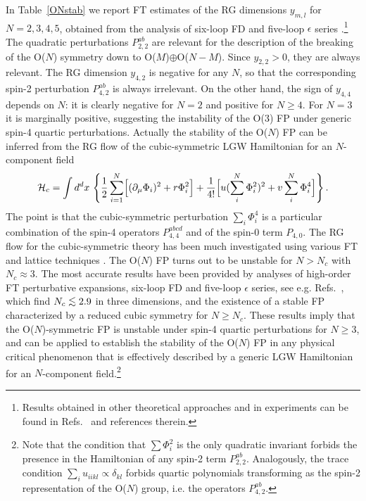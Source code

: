 \documentclass[a4paper,12pt]{article}
\def\spose#1{\hbox to 0pt{#1\hss}}
\def\ltapprox{\mathrel{\spose{\lower 3pt\hbox{$\mathchar"218$}}
 \raise 2.0pt\hbox{$\mathchar"13C$}}}
\begin{document}
In Table~\ref{ONstab} we report FT estimates of 
the RG dimensions $y_{m,l}$
for $N=2,3,4,5$, obtained from the analysis of six-loop FD
and five-loop $\epsilon$ series 
\cite{CPV-02,CPV-02-mc,GZ-98}.\footnote{Results obtained in 
other theoretical approaches and in experiments  
can be found in Refs.~\cite{CPV-02-mc,review} and references therein.}
The quadratic perturbations $P_{2,2}^{ab}$ are relevant for the description of 
the breaking of the O($N$) symmetry down to O($M$)$\oplus$O($N-M$).
Since $y_{2,2}>0$, they are always relevant.
The RG dimension $y_{4,2}$ is negative for any $N$, so that the corresponding
spin-2 perturbation $P_{4,2}^{ab}$ is always irrelevant.
On the other hand, the sign of $y_{4,4}$ depends on $N$:
it is clearly negative for $N=2$ and positive for $N\ge 4$.
For $N=3$ it is marginally positive, suggesting the instability
of the O(3) FP under generic spin-4 quartic perturbations.
Actually the stability of the O($N$) FP 
can be inferred from the RG flow of the cubic-symmetric LGW Hamiltonian
for an $N$-component field
\begin{equation}
{\cal H}_{c} =  \int d^d x\, \left\{ {1\over 2} \sum_{i=1}^{N}
      \Bigl[ (\partial_\mu \Phi_i)^2 +  r \Phi_i^2 \Bigr]  
+{1\over 4!} \Bigl[ u (\sum_i^N \Phi_i^2)^2 + v \sum_i^N \Phi_i^4 \Bigr]
\right \} .
\label{Hphi4cubic}
\end{equation}
The point is that the cubic-symmetric 
perturbation $\sum_i \Phi_i^4$
is a particular combination of the spin-4 operators $P_{4,4}^{abcd}$ and 
of the spin-0 term $P_{4,0}$.  
The RG flow for the cubic-symmetric theory has been much investigated
using various FT and lattice techniques \cite{review}. 
The O($N$) FP turns out to be unstable for $N>N_c$ with $N_c\approx 3$.
The most accurate results have been provided by analyses of 
high-order FT perturbative expansions, six-loop FD 
and five-loop $\epsilon$ series, see e.g. Refs.~\cite{CPV-00,FHY-00},
which find $N_c\ltapprox 2.9$ in three dimensions, and the existence of 
a stable FP characterized by a reduced cubic symmetry for $N\geq N_c$.
These results imply that
the O($N$)-symmetric FP is unstable under spin-4 quartic perturbations 
for $N\ge 3$,
and can be applied to establish the stability of the O($N$) FP
in any physical critical phenomenon that is effectively described
by a generic LGW Hamiltonian for an $N$-component 
field.\footnote{
Note that the condition that $\sum \Phi^2_i$ is the only quadratic 
invariant forbids the presence in the Hamiltonian 
of any spin-2 term $P^{ab}_{2,2}$. Analogously,
the trace condition $\sum_i u_{iikl} \propto \delta_{kl}$
forbids quartic polynomials transforming as the spin-2 
representation of the O($N$) group, i.e. the operators $P_{4,2}^{ab}$.}
\end{document}
